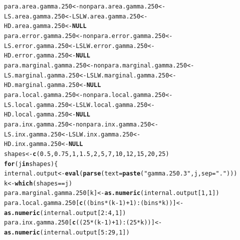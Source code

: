 \documentclass[11pt]{article}\usepackage[]{graphicx}\usepackage[]{color}
\makeatletter
\newcommand{\hlnum}[1]{\textcolor[rgb]{0.686,0.059,0.569}{#1}}%
\newcommand{\hlstr}[1]{\textcolor[rgb]{0.192,0.494,0.8}{#1}}%
\newcommand{\hlopt}[1]{\textcolor[rgb]{0,0,0}{#1}}%
\newcommand{\hlstd}[1]{\textcolor[rgb]{0.345,0.345,0.345}{#1}}%
\newcommand{\hlkwa}[1]{\textcolor[rgb]{0.161,0.373,0.58}{\textbf{#1}}}%
\newcommand{\hlkwb}[1]{\textcolor[rgb]{0.69,0.353,0.396}{#1}}%
\newcommand{\hlkwc}[1]{\textcolor[rgb]{0.333,0.667,0.333}{#1}}%
\newcommand{\hlkwd}[1]{\textcolor[rgb]{0.737,0.353,0.396}{\textbf{#1}}}%
\newenvironment{kframe}{%
 \def\at@end@of@kframe{}%
 \ifinner\ifhmode%
  \def\at@end@of@kframe{\end{minipage}}%
  \begin{minipage}{\columnwidth}%
 \fi\fi%
 \def\FrameCommand##1{\hskip\@totalleftmargin \hskip-\fboxsep
 \colorbox{shadecolor}{##1}\hskip-\fboxsep
     \hskip-\linewidth \hskip-\@totalleftmargin \hskip\columnwidth}%
 \MakeFramed {\advance\hsize-\width
   \@totalleftmargin\z@ \linewidth\hsize
   \@setminipage}}%
 {\par\unskip\endMakeFramed%
 \at@end@of@kframe}
\newenvironment{knitrout}{}{} %
\makeatother
\begin{document}
\begin{knitrout}
\color{fgcolor}\begin{kframe}
\begin{alltt}
\hlstd{para.area.gamma.250} \hlkwb{<-} \hlstd{nonpara.area.gamma.250} \hlkwb{<-}
  \hlstd{LS.area.gamma.250} \hlkwb{<-} \hlstd{LSLW.area.gamma.250} \hlkwb{<-}
  \hlstd{HD.area.gamma.250} \hlkwb{<-} \hlkwa{NULL}
\hlstd{para.error.gamma.250} \hlkwb{<-} \hlstd{nonpara.error.gamma.250} \hlkwb{<-}
  \hlstd{LS.error.gamma.250} \hlkwb{<-} \hlstd{LSLW.error.gamma.250} \hlkwb{<-}
  \hlstd{HD.error.gamma.250} \hlkwb{<-} \hlkwa{NULL}
\hlstd{para.marginal.gamma.250} \hlkwb{<-} \hlstd{nonpara.marginal.gamma.250} \hlkwb{<-}
  \hlstd{LS.marginal.gamma.250} \hlkwb{<-} \hlstd{LSLW.marginal.gamma.250} \hlkwb{<-}
  \hlstd{HD.marginal.gamma.250} \hlkwb{<-} \hlkwa{NULL}
\hlstd{para.local.gamma.250} \hlkwb{<-} \hlstd{nonpara.local.gamma.250} \hlkwb{<-}
  \hlstd{LS.local.gamma.250} \hlkwb{<-} \hlstd{LSLW.local.gamma.250} \hlkwb{<-}
  \hlstd{HD.local.gamma.250} \hlkwb{<-} \hlkwa{NULL}
\hlstd{para.inx.gamma.250} \hlkwb{<-} \hlstd{nonpara.inx.gamma.250} \hlkwb{<-}
  \hlstd{LS.inx.gamma.250} \hlkwb{<-} \hlstd{LSLW.inx.gamma.250} \hlkwb{<-}
  \hlstd{HD.inx.gamma.250} \hlkwb{<-} \hlkwa{NULL}
\hlstd{shapes} \hlkwb{<-} \hlkwd{c}\hlstd{(}\hlnum{0.5}\hlstd{,} \hlnum{0.75}\hlstd{,} \hlnum{1}\hlstd{,} \hlnum{1.5}\hlstd{,} \hlnum{2}\hlstd{,} \hlnum{5}\hlstd{,} \hlnum{7}\hlstd{,} \hlnum{10}\hlstd{,} \hlnum{12}\hlstd{,} \hlnum{15}\hlstd{,} \hlnum{20}\hlstd{,} \hlnum{25}\hlstd{)}
\hlkwa{for}\hlstd{(j} \hlkwa{in} \hlstd{shapes )\{}
  \hlstd{internal.output} \hlkwb{<-} \hlkwd{eval}\hlstd{(}\hlkwd{parse}\hlstd{(}\hlkwc{text}\hlstd{=}\hlkwd{paste}\hlstd{(}\hlstr{"gamma.250.3"}\hlstd{, j,} \hlkwc{sep} \hlstd{=} \hlstr{"."}\hlstd{)))}
  \hlstd{k} \hlkwb{<-} \hlkwd{which}\hlstd{(shapes} \hlopt{==} \hlstd{j)}
  \hlstd{para.marginal.gamma.250[k]} \hlkwb{<-} \hlkwd{as.numeric}\hlstd{(internal.output[}\hlnum{1}\hlstd{,} \hlnum{1}\hlstd{])}
  \hlstd{para.local.gamma.250[}\hlkwd{c}\hlstd{((bins}\hlopt{*}\hlstd{(k}\hlopt{-}\hlnum{1}\hlstd{)}\hlopt{+}\hlnum{1}\hlstd{)}\hlopt{:}\hlstd{(bins}\hlopt{*}\hlstd{k))]} \hlkwb{<-}
    \hlkwd{as.numeric}\hlstd{(internal.output[}\hlnum{2}\hlopt{:}\hlnum{4}\hlstd{,} \hlnum{1}\hlstd{])}
  \hlstd{para.inx.gamma.250[}\hlkwd{c}\hlstd{((}\hlnum{25}\hlopt{*}\hlstd{(k}\hlopt{-}\hlnum{1}\hlstd{)}\hlopt{+}\hlnum{1}\hlstd{)}\hlopt{:}\hlstd{(}\hlnum{25}\hlopt{*}\hlstd{k))]} \hlkwb{<-}
    \hlkwd{as.numeric}\hlstd{(internal.output[}\hlnum{5}\hlopt{:}\hlnum{29}\hlstd{,} \hlnum{1}\hlstd{])}

\end{alltt}
\end{kframe}
\end{knitrout}
\end{document}
